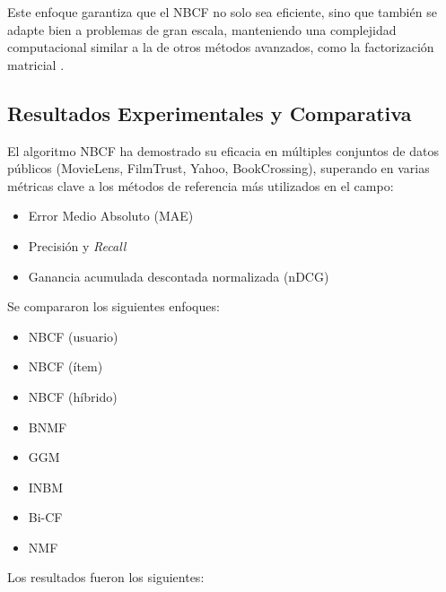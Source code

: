 \documentclass[runningheads,a4paper]{llncs}
\begin{document}
Este enfoque garantiza que el NBCF no solo sea 
eficiente, sino que también se adapte bien a problemas 
de gran escala, manteniendo una complejidad 
computacional similar a la de otros métodos avanzados, 
como la factorización matricial \cite{tesis_sistema_recomendador_hibrido}.

\subsection{Resultados Experimentales y Comparativa}

El algoritmo NBCF ha demostrado su eficacia en 
múltiples conjuntos de datos públicos 
(MovieLens, FilmTrust, Yahoo, BookCrossing)\cite{tesis_sistema_recomendador_hibrido}, superando en 
varias métricas clave a los métodos de referencia más 
utilizados en el campo:
\begin{itemize}
    \item Error Medio Absoluto (MAE) \cite{tesis_sistema_recomendador_hibrido}
    \item Precisión y \textit{Recall} \cite{tesis_sistema_recomendador_hibrido}
    \item Ganancia acumulada descontada normalizada (nDCG) \cite{tesis_sistema_recomendador_hibrido}
\end{itemize}
Se compararon los siguientes enfoques:
\begin{itemize}
    \item NBCF (usuario)
    \item NBCF (ítem)
    \item NBCF (híbrido)
    \item BNMF
    \item GGM
    \item INBM
    \item Bi-CF
    \item NMF
\end{itemize}
Los resultados fueron los siguientes:
\end{document}
